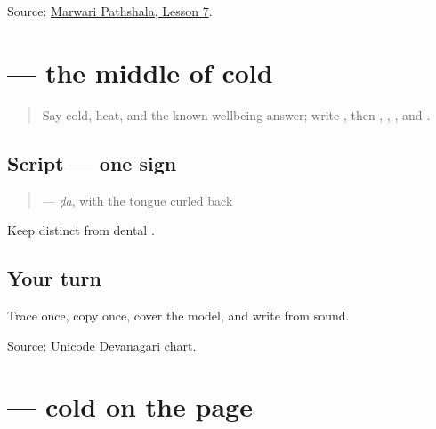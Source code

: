 \begin{tcolorbox}[breakable,colback=teal!4,colframe=teal!35!black,title={Before you move on}]
Source: \href{https://www.marwaripathshala.com/marwari-lesson-7-english}{Marwari Pathshala, Lesson 7}.
\end{tcolorbox}
\section[\texorpdfstring{\mw{ड} (ḍa)}{ड (ḍa)}]{ — the middle of cold}

\label{lesson:MW-W12-dda}



\begin{quote}
Say cold, heat, and the known wellbeing answer; write \textbf{  }, then \textbf{}, \textbf{}, \textbf{}, and \textbf{}.
\end{quote}

\subsection*{Script — one sign}

\begin{quote}
\textbf{} — \emph{ḍa}, with the tongue curled back
\end{quote}

Keep \textbf{} distinct from dental \textbf{}.

\subsection*{Your turn}
Trace once, copy once, cover the model, and write \textbf{} from sound.

\begin{tcolorbox}[breakable,colback=teal!4,colframe=teal!35!black,title={Before you move on}]
Source: \href{https://www.unicode.org/charts/PDF/U0900.pdf}{Unicode Devanagari chart}.
\end{tcolorbox}
\section[\texorpdfstring{\mw{ठंडी} (ṭhaṇḍī)}{ठंडी (ṭhaṇḍī)}]{ — cold on the page}

\label{lesson:MW-C12-thandi}



